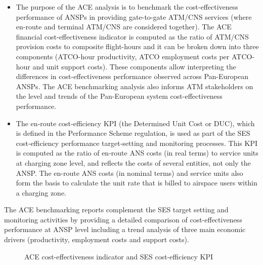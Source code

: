 \documentclass[
  11pt,
  a4paperpaper,
  openany,headsepline=on,footsepline=off,DIV=12,table]{scrbook}
\begin{document}
\begin{itemize}
\item
  The purpose of the ACE analysis is to benchmark the cost-effectiveness
  performance of ANSPs in providing gate-to-gate ATM/CNS services (where
  en-route and terminal ATM/CNS are considered together). The ACE
  financial cost-effectiveness indicator is computed as the ratio of
  ATM/CNS provision costs to composite flight-hours and it can be broken
  down into three components (ATCO-hour productivity, ATCO employment
  costs per ATCO-hour and unit support costs). These components allow
  interpreting the differences in cost-effectiveness performance
  observed across Pan-European ANSPs. The ACE benchmarking analysis also
  informs ATM stakeholders on the level and trends of the Pan-European
  system cost-effectiveness performance.
\item
  The en‐route cost‐efficiency KPI (the Determined Unit Cost or DUC),
  which is defined in the Performance Scheme regulation, is used as part
  of the SES cost‐efficiency performance target‐setting and monitoring
  processes. This KPI is computed as the ratio of en‐route ANS costs (in
  real terms) to service units at charging zone level, and reflects the
  costs of several entities, not only the ANSP. The en-route ANS costs
  (in nominal terms) and service units also form the basis to calculate
  the unit rate that is billed to airspace users within a charging zone.
\end{itemize}

The ACE benchmarking reports complement the SES target setting and
monitoring activities by providing a detailed comparison of
cost-effectiveness performance at ANSP level including a trend analysis
of three main economic drivers (productivity, employment costs and
support costs).

\begin{figure}[H]


\caption{\label{fig-indicator-and-kpi}ACE cost-effectiveness indicator
and SES cost-efficiency KPI}

\end{figure}%
\end{document}
